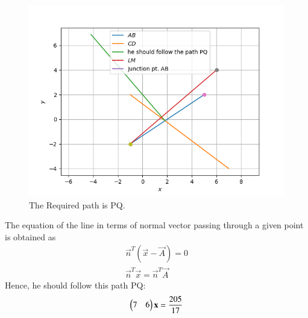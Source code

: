 \begin{figure}[!htbp]
\centering \includegraphics[width=\columnwidth]{./solutions/line_plane/60/Figure_1.png}
\caption{The Required path is PQ.}
\label{fig:solutions/line_plane/60/ Path PQ}
\end{figure}

The equation of the line in terms of normal vector passing through a given point is obtained as\\
\begin{align}
\vec{n}^T(\vec{x}-\vec{A})=0 \label{eqn:solutions/line_plane/609} \\
\vec{n}^T\vec{x}=\vec{n}^T\vec{A} \label{eqn:solutions/line_plane/6010}
\end{align}
Hence, he should follow this path PQ:
\begin{align}
\begin{pmatrix}7 & 6\end{pmatrix} \textbf{x} = \frac{205}{17}\label{eqn:solutions/line_plane/6011}
\end{align}



